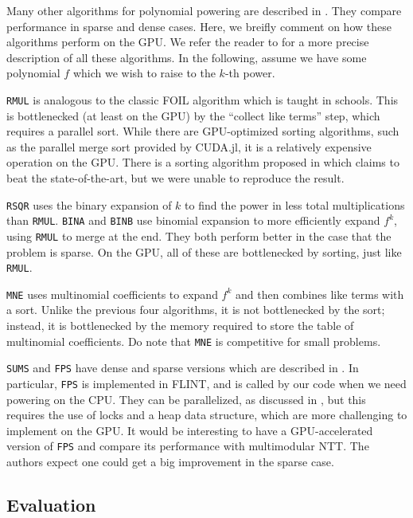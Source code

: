 \documentclass[a4paper]{article}
\newcommand{\code}[1]{\textnormal{\texttt{#1}}}
\theoremstyle{definition}
\theoremstyle{remark}
\begin{document}
Many other algorithms 
for polynomial powering
are described in \cite{monagan-2012-sparse-powering}. 
They compare performance in sparse and dense cases. 
Here, we breifly comment on how these algorithms perform on the GPU.
We refer the reader to \cite{monagan-2012-sparse-powering}
for a more precise description of all these algorithms.
In the following, assume we have some polynomial \(f\) which we wish 
to raise to the \(k\)-th power.

\code{RMUL} is analogous to the classic FOIL algorithm which is taught in schools. 
This is bottlenecked (at least on the GPU) by the ``collect like terms'' step, 
which requires a parallel sort.
While there are GPU-optimized sorting algorithms, such as the parallel merge sort
provided by CUDA.jl, it is a relatively expensive operation on the GPU.
There is a sorting algorithm proposed in \cite{gupta-2023-gpu-sort}
which claims to beat the state-of-the-art, but we were unable to reproduce the result.

\code{RSQR} uses the binary expansion of \(k\) to find the power in less
total multiplications than \code{RMUL}.
\code{BINA} and \code{BINB} use binomial expansion to more efficiently 
expand \(f^{k}\), using \code{RMUL} to merge at the end.
They both perform better in the case that the problem is sparse.
On the GPU, all of these are bottlenecked by sorting, just like
\code{RMUL}.

\code{MNE} uses multinomial coefficients to expand \(f^{k}\) 
and then combines like terms with a sort. 
Unlike the previous four algorithms, it is not bottlenecked by the sort;
instead, it is bottlenecked by the memory required to store the table of
multinomial coefficients. Do note that \code{MNE} is 
competitive for small problems.

\code{SUMS} and \code{FPS} have dense and sparse versions which are described in 
\cite{monagan-2012-sparse-powering}.
In particular, \code{FPS} is implemented in FLINT, and is called by our
code when we need powering on the CPU.
They can be parallelized, as discussed in \cite{monagan-2012-sparse-powering},
but this requires the use of locks and a heap data structure,
which are more challenging to implement on the GPU.
It would be interesting to have a GPU-accelerated version of
\code{FPS} and compare its performance with 
multimodular NTT.
The authors expect one could get a big improvement in the sparse case.

\subsection{Evaluation}
\end{document}
